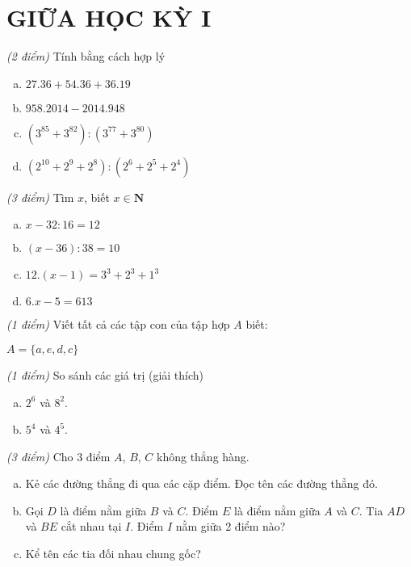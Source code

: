 \section{GIỮA HỌC KỲ I}
\setcounter{ex}{0}
\begin{ex}  \textit{(2 điểm)} Tính bằng cách hợp lý
\begin{multicols}{2}
\begin{enumerate}[a)]
\item $27.36 + 54.36 + 36.19$
\item $958.2014 - 2014.948$
\item $\left( {{3^{85}} + {3^{82}}} \right):\left( {{3^{77}} + {3^{80}}} \right)$
\item $\left( {{2^{10}} + {2^9} + {2^8}} \right):\left( {{2^6} + {2^5} + {2^4}} \right)$
\end{enumerate}
\end{multicols}
\end{ex}   
\begin{ex}  \textit{(3 điểm)} Tìm $x$, biết $x \in  \mathbf{N}$
\begin{multicols}{2}
\begin{enumerate}[a)]
\item $x - 32:16 = 12$
\item $\left( {x - 36} \right):38 = 10$
\item $12.\left( {x - 1} \right) = {3^3} + {2^3} + {1^3}$
\item $6.x - 5 = 613$
\end{enumerate}
\end{multicols}
\end{ex}    
\begin{ex}  \textit{(1 điểm)} Viết tất cả các tập con của tập hợp $A$ biết: 
\begin{center}
$ A = \{ a, e, d, c \} $
\end{center}
\end{ex}    
\begin{ex}  \textit{(1 điểm)} So sánh các giá trị (giải thích) 
\begin{enumerate}[a)]
\item $2^6$ và $8^2$.
\item $5^4$ và $4^5$.
\end{enumerate}
\end{ex}    
\begin{ex}  \textit{(3 điểm)} Cho 3 điểm $A$, $B$, $C$ không thẳng hàng.
\begin{enumerate}[a)]
\item Kẻ các đường thẳng đi qua các cặp điểm. Đọc tên các đường thẳng đó.
\item Gọi $D$ là điểm nằm giữa $B$ và $C$. Điểm $E$ là điểm nằm giữa $A$ và $C$. Tia $AD$ và $BE$ cắt nhau tại $I$. Điểm $I$ nằm giữa 2 điểm nào?
\item Kể tên các tia đối nhau chung gốc?
\end{enumerate}
\end{ex}